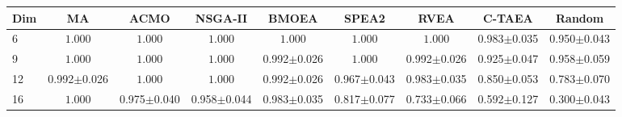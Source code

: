 \begin{tabular}{@{}lcccccccc@{}}
\toprule
Dim & MA & ACMO & NSGA-II & BMOEA & SPEA2 & RVEA & C-TAEA & Random \\
\midrule
6 & \textbf{$\mathbf{1.000}$} & \textbf{$\mathbf{1.000}$} & \textbf{$\mathbf{1.000}$} & \textbf{$\mathbf{1.000}$} & \textbf{$\mathbf{1.000}$} & \textbf{$\mathbf{1.000}$} & 0.983$\pm$0.035 & 0.950$\pm$0.043 \\
9 & \textbf{$\mathbf{1.000}$} & \textbf{$\mathbf{1.000}$} & \textbf{$\mathbf{1.000}$} & 0.992$\pm$0.026 & \textbf{$\mathbf{1.000}$} & 0.992$\pm$0.026 & 0.925$\pm$0.047 & 0.958$\pm$0.059 \\
12 & 0.992$\pm$0.026 & \textbf{$\mathbf{1.000}$} & \textbf{$\mathbf{1.000}$} & 0.992$\pm$0.026 & 0.967$\pm$0.043 & 0.983$\pm$0.035 & 0.850$\pm$0.053 & 0.783$\pm$0.070 \\
16 & \textbf{$\mathbf{1.000}$} & 0.975$\pm$0.040 & 0.958$\pm$0.044 & 0.983$\pm$0.035 & 0.817$\pm$0.077 & 0.733$\pm$0.066 & 0.592$\pm$0.127 & 0.300$\pm$0.043 \\
\bottomrule
\end{tabular}